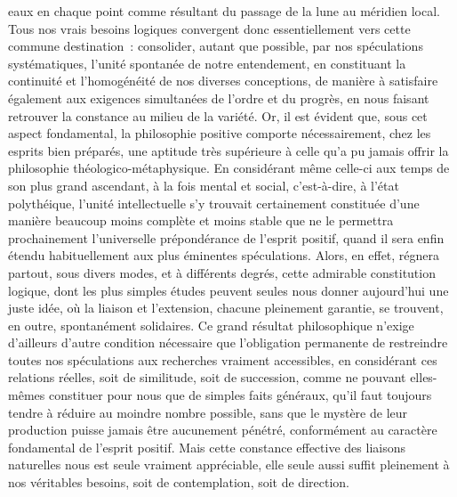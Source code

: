 \documentclass[french,twoside]{book} %
\begin{document}
eaux en chaque point comme résultant du passage de la lune au méridien local. Tous nos vrais besoins logiques convergent donc essentiellement vers cette commune destination : consolider, autant que possible, par nos spéculations systématiques, l’unité spontanée de notre entendement, en constituant la continuité et l’homogénéité de nos diverses conceptions, de manière à satisfaire également aux exigences simultanées de l’ordre et du progrès, en nous faisant retrouver la constance au milieu de la variété. Or, il est évident que, sous cet aspect fondamental, la philosophie positive comporte nécessairement, chez les esprits bien préparés, une aptitude très supérieure à celle qu’a pu jamais offrir la philosophie théologico-métaphysique. En considérant même celle-ci aux temps de son plus grand ascendant, à la fois mental et social, c’est-à-dire, à l’état polythéique, l’unité intellectuelle s’y trouvait certainement constituée d’une manière beaucoup moins complète et moins stable que ne le permettra prochainement l’universelle prépondérance de l’esprit positif, quand il sera enfin étendu habituellement aux plus éminentes spéculations. Alors, en effet, régnera partout, sous divers modes, et à différents degrés, cette admirable constitution logique, dont les plus simples études peuvent seules nous donner aujourd’hui une juste idée, où la liaison et l’extension, chacune pleinement garantie, se trouvent, en outre, spontanément solidaires. Ce grand résultat philosophique n’exige d’ailleurs d’autre condition nécessaire que l’obligation permanente de restreindre toutes nos spéculations aux recherches vraiment accessibles, en considérant ces relations réelles, soit de similitude, soit de succession, comme ne pouvant elles-mêmes constituer pour nous que de simples faits généraux, qu’il faut toujours tendre à réduire au moindre nombre possible, sans que le mystère de leur production puisse jamais être aucunement pénétré, conformément au caractère fondamental de l’esprit positif. Mais cette constance effective des liaisons naturelles nous est seule vraiment appréciable, elle seule aussi suffit pleinement à nos véritables besoins, soit de contemplation, soit de direction.\par
\end{document}
